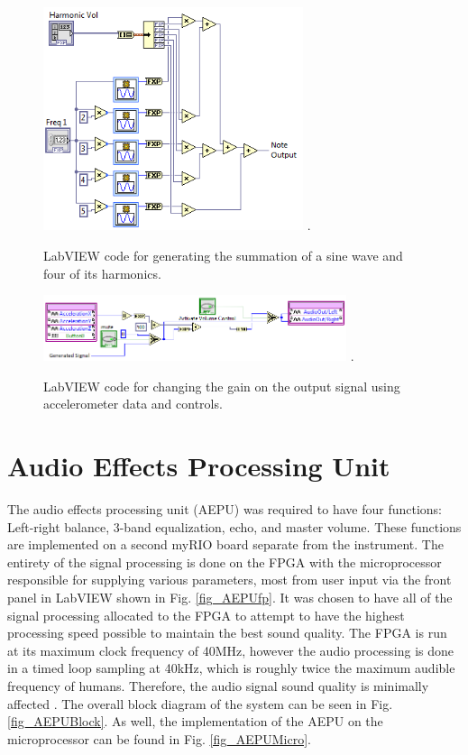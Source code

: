 \begin{figure}[!t]
\centering
\includegraphics[width=3in]{NoteGeneration.png}
\DeclareGraphicsExtensions.
\caption{LabVIEW code for generating the summation of a sine wave and four of its harmonics.}
\label{fig_notegen}
\end{figure} 

\begin{figure}[!t]
\centering
\includegraphics[width=3.5in]{AccelerometerVolume.png}
\DeclareGraphicsExtensions.
\caption{LabVIEW code for changing the gain on the output signal using accelerometer data and controls.}
\label{fig_accvol}
\end{figure} 




\section{Audio Effects Processing Unit}
The audio effects processing unit (AEPU) was required to have four functions: Left-right balance, 3-band equalization, echo, and master volume. 
These functions are implemented on a second myRIO board separate from the instrument.
The entirety of the signal processing is done on the FPGA with the microprocessor responsible for supplying various parameters, most from user input via the front panel in LabVIEW shown in Fig. \ref{fig_AEPUfp}. 
It was chosen to have all of the signal processing allocated to the FPGA to attempt to have the highest processing speed possible to maintain the best sound quality.
The FPGA is run at its maximum clock frequency of 40MHz, however the audio processing is done in a timed loop sampling at 40kHz, which is roughly twice the maximum audible frequency of humans. 
Therefore, the audio signal sound quality is minimally affected \cite{audio_fundamentals}.
The overall block diagram of the system can be seen in Fig. \ref{fig_AEPUBlock}.
As well, the implementation of the AEPU on the microprocessor can be found in Fig. \ref{fig_AEPUMicro}.

